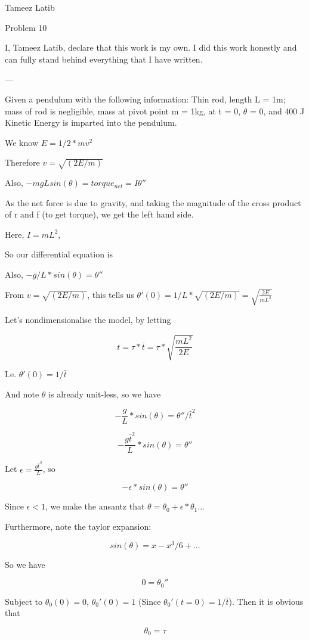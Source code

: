 \documentclass{article}
\begin{document}
Tameez Latib

Problem 10

I, Tameez Latib, declare that this work is my own. I did this work honestly and can fully stand behind everything that I have written.

---

Given a pendulum with the following information:
Thin rod, length L = 1m; mass of rod is negligible, mass at pivot point m = 1kg, at t = 0, $\theta$ = 0, and 400 J Kinetic Energy is imparted into the pendulum.

We know $E = 1/2 * mv^2$ 

Therefore $v = \sqrt{(2E/m)}$

Also, $-mgL sin(\theta) = torque_{net} = I \theta''$ 

As the net force is due to gravity, and taking the magnitude of the cross product of r and f (to get torque), we get the left hand side.

Here, $I = mL^2,$ 

So our differential equation is

Also, $-g/L*sin(\theta) = \theta''$ 

From $v = \sqrt{(2E/m)}$, this tells us $\theta'(0) = 1/L*\sqrt{(2E/m)} = \sqrt{\frac{2E}{mL^2}}$ 

Let's nondimensionalise the model, by letting

$$t = \tau*\bar{t} = \tau*\sqrt{\frac{mL^2}{2E}}$$

I.e. $\theta'(0) = 1/\bar{t} $

And note $\theta$ is already unit-less, so we have 

$$-\frac{g}{L}*sin(\theta) = \theta'' / \bar{t}^2$$

$$-\frac{g \bar{t}^2}{L}*sin(\theta) = \theta''$$

Let $\epsilon = \frac{g \bar{t}^2}{L}$, so

$$-\epsilon*sin(\theta) = \theta''$$

Since $\epsilon < 1$, we make the ansantz that $\theta = \theta_0 + \epsilon*\theta_1 ... $

Furthermore, note the taylor expansion:

$$sin(\theta) = x - x^3/6 + ...$$

So we have 

$$0 = \theta_0''$$

Subject to $\theta_0(0) = 0$, $\theta_0'(0) = 1$ (Since $\theta_0'(t=0) = 1/\bar{t}$). Then it is obvious that

$$\theta_0 = \tau $$
\end{document}
